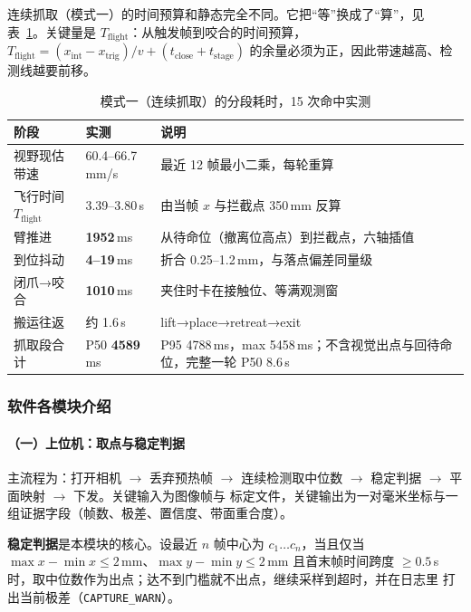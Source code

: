 \documentclass[UTF8,a4paper,zihao=5,fontset=windows]{ctexart}
\newcommand{\code}[1]{\texttt{\small #1}}
\begin{document}
连续抓取（模式一）的时间预算和静态完全不同。它把“等”换成了“算”，见
表~\ref{tab:timing2}。关键量是 $T_{\text{flight}}$：从触发帧到咬合的时间预算，
$T_{\text{flight}} = (x_{\text{int}} - x_{\text{trig}}) / v + (t_{\text{close}} + t_{\text{stage}})$
的余量必须为正，因此带速越高、检测线越要前移。

\begin{table}[H]\centering\small
\caption{模式一（连续抓取）的分段耗时，15 次命中实测}
\label{tab:timing2}
\begin{tabularx}{\linewidth}{@{}p{3.0cm}p{3.0cm}X@{}}
\toprule
阶段 & 实测 & 说明 \\
\midrule
视野现估带速 & 60.4--66.7\,mm/s & 最近 12 帧最小二乘，每轮重算 \\
飞行时间 $T_{\text{flight}}$ & 3.39--3.80\,s & 由当帧 $x$ 与拦截点 350\,mm 反算 \\
臂推进 & \textbf{1952}\,ms & 从待命位（撤离位高点）到拦截点，六轴插值 \\
到位抖动 & \textbf{4--19}\,ms & 折合 0.25--1.2\,mm，与落点偏差同量级 \\
闭爪→咬合 & \textbf{1010}\,ms & 夹住时卡在接触位、等满观测窗 \\
搬运往返 & 约 1.6\,s & lift→place→retreat→exit \\
\midrule
抓取段合计 & P50 \textbf{4589}\,ms & P95 4788\,ms，max 5458\,ms；不含视觉出点与回待命位，完整一轮 P50 8.6\,s \\
\bottomrule
\end{tabularx}
\end{table}

\subsubsection{软件各模块介绍}

\paragraph{（一）上位机：取点与稳定判据}

主流程为：打开相机 $\rightarrow$ 丢弃预热帧 $\rightarrow$ 连续检测取中位数
$\rightarrow$ 稳定判据 $\rightarrow$ 平面映射 $\rightarrow$ 下发。关键输入为图像帧与
标定文件，关键输出为一对毫米坐标与一组证据字段（帧数、极差、置信度、带面重合度）。

\textbf{稳定判据}是本模块的核心。设最近 $n$ 帧中心为 $c_1 \ldots c_n$，当且仅当
$\max x - \min x \leq 2$\,mm、$\max y - \min y \leq 2$\,mm 且首末帧时间跨度
$\geq 0.5$\,s 时，取中位数作为出点；达不到门槛就不出点，继续采样到超时，并在日志里
打出当前极差（\code{CAPTURE\_WARN}）。
\end{document}
